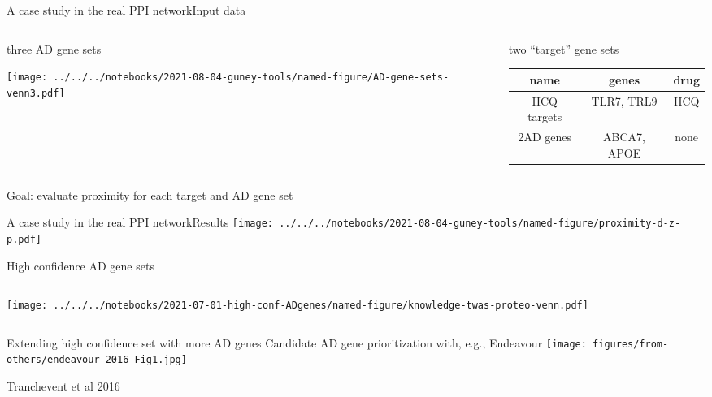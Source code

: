 \documentclass{beamer}
\begin{document}
\begin{frame}{A case study in the real PPI network}{Input data}
\begin{columns}[t]
\begin{column}{0.5\textwidth}

\begin{center}
three AD gene sets
\end{center}

\texttt{[image: ../../../notebooks/2021-08-04-guney-tools/named-figure/AD-gene-sets-venn3.pdf]}
\end{column}

\begin{column}{0.5\textwidth}

\begin{center}
two ``target'' gene sets
\end{center}
	\footnotesize
\begin{tabular}{ccc}
name & genes & drug \\
\hline
HCQ targets & TLR7, TRL9 & HCQ \\
2AD genes & ABCA7, APOE  & none \\
\end{tabular}
\end{column}
\end{columns}
\begin{center}
Goal: evaluate proximity for each target and AD gene set
\end{center}
\end{frame}

\begin{frame}{A case study in the real PPI network}{Results}
\texttt{[image: ../../../notebooks/2021-08-04-guney-tools/named-figure/proximity-d-z-p.pdf]}
\end{frame}

\begin{frame}{High confidence AD gene sets}
\begin{columns}[t]
\begin{column}{0.5\textwidth}

\texttt{[image: ../../../notebooks/2021-07-01-high-conf-ADgenes/named-figure/knowledge-twas-proteo-venn.pdf]}
\end{column}

\begin{column}{0.5\textwidth}

\end{column}
\end{columns}
\end{frame}

\begin{frame}{Extending high confidence set with more AD genes}
	{Candidate AD gene prioritization with, e.g., Endeavour}
\texttt{[image: figures/from-others/endeavour-2016-Fig1.jpg]}

\vfill
\tiny Tranchevent et al 2016
\end{frame}
\end{document}

